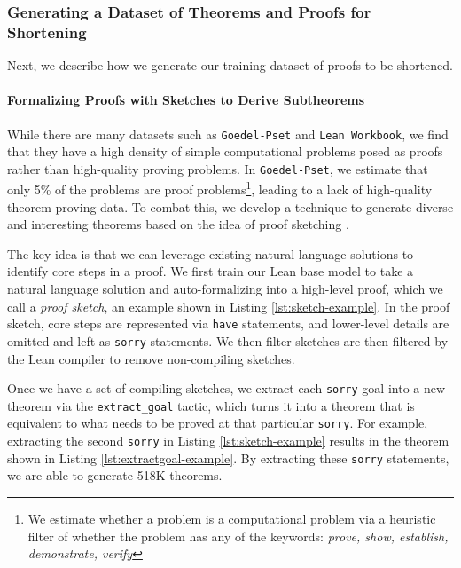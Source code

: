 \subsubsection{Generating a Dataset of Theorems and Proofs for Shortening} \label{subsec:proof-shortening-dataset}
Next, we describe how we generate our training dataset of proofs to be shortened.

\paragraph{Formalizing Proofs with Sketches to Derive Subtheorems} While there are many datasets such as \texttt{Goedel-Pset} and \texttt{Lean Workbook}, we find that they have a high density of simple computational problems posed as proofs rather than high-quality proving problems. In \texttt{Goedel-Pset}, we estimate that only 5\% of the problems are proof problems\footnote{We estimate whether a problem is a computational problem via a heuristic filter of whether the problem has any of the keywords: \textit{prove, show, establish, demonstrate, verify}}, leading to a lack of high-quality theorem proving data. To combat this, we develop a technique to generate diverse and interesting theorems based on the idea of proof sketching \citep{jiang2022draft}.

The key idea is that we can leverage existing natural language solutions to identify core steps in a proof. We first train our Lean base model to take a natural language solution and auto-formalizing into a high-level proof, which we call a \textit{proof sketch}, an example shown in Listing \ref{lst:sketch-example}. In the proof sketch, core steps are represented via \texttt{have} statements, and lower-level details are omitted and left as \texttt{sorry} statements. We then filter sketches are then filtered by the Lean compiler to remove non-compiling sketches.

Once we have a set of compiling sketches, we extract each \texttt{sorry} goal into a new theorem via the \texttt{extract\_goal} tactic, which turns it into a theorem that is equivalent to what needs to be proved at that particular \texttt{sorry}. For example, extracting the second \texttt{sorry} in Listing \ref{lst:sketch-example} results in the theorem shown in Listing \ref{lst:extractgoal-example}. By extracting these \texttt{sorry} statements, we are able to generate 518K theorems.

